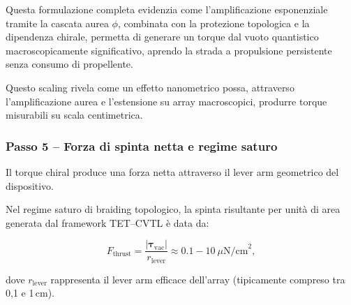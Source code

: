 \documentclass[11pt,a4paper]{article}
\theoremstyle{plain}
\theoremstyle{definition}
\begin{document}
Questa formulazione completa evidenzia come l'amplificazione esponenziale tramite la cascata aurea \(\phi\), combinata con la protezione topologica e la dipendenza chirale, permetta di generare un torque dal vuoto quantistico macroscopicamente significativo, aprendo la strada a propulsione persistente senza consumo di propellente.

\vspace{0.3cm}

Questo scaling rivela come un effetto nanometrico possa, attraverso l'amplificazione aurea e l'estensione su array macroscopici, produrre torque misurabili su scala centimetrica.


\vspace{0.3cm}



\subsubsection{Passo 5 – Forza di spinta netta e regime saturo}

Il torque chiral produce una forza netta attraverso il lever arm geometrico del dispositivo. 

\vspace{0.2cm}


\begin{tcolorbox}[
    colback=orange!5!white,
    colframe=orange!80!black,
    coltitle=white,
    fonttitle=\bfseries,
    title=Densità di Spinta nel Regime Saturo di Braiding,
    sharp corners,
    boxrule=0.8pt,
    enhanced,
    attach boxed title to top left={xshift=12pt, yshift=-3mm},
    boxed title style={colback=purple!70!black}
]

Nel regime saturo di braiding topologico, la spinta risultante per unità di area generata dal framework TET–CVTL è data da:

\begin{equation}
F_{\text{thrust}} = \frac{|\boldsymbol{\tau}_{\text{vac}}|}{r_{\text{lever}}} \approx 0.1 - 10~\mu\text{N/cm}^2,
\label{eq:thrust_density}
\end{equation}


\end{tcolorbox}

\vspace{0.2cm}



dove \(r_{\text{lever}}\) rappresenta il lever arm efficace dell'array (tipicamente compreso tra 0,1 e 1\,cm).

\vspace{0.3cm}
\end{document}
